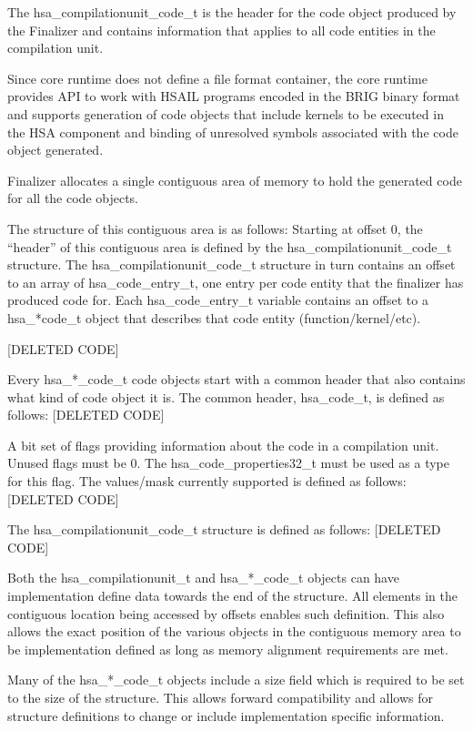 \documentclass[draft]{book}
\newcommand{\reftyp}[1]{#1}
\begin{document}
The \reftyp{hsa_compilationunit_code_t} is the header for the code object
produced by the Finalizer and contains information that applies to all code
entities in the compilation unit.

Since core runtime does not define a file format container, the core runtime
provides API to work with HSAIL programs encoded in the BRIG binary format and
supports generation of code objects that include kernels to be executed in the
HSA component and binding of unresolved symbols associated with the code object
generated.

Finalizer allocates a single contiguous area of memory to hold the generated
code for all the code objects.

The structure of this contiguous area is as follows: Starting at offset 0, the
``header'' of this contiguous area is defined by the
\reftyp{hsa_compilationunit_code_t} structure. The
\reftyp{hsa_compilationunit_code_t} structure in turn contains an offset to
an array of \reftyp{hsa_code_entry_t}, one entry per code entity that the
finalizer has produced code for. Each \reftyp{hsa_code_entry_t} variable
contains an offset to a \reftyp{hsa_*code_t} object that describes that code
entity (function/kernel/etc).

[DELETED CODE]

Every \reftyp{hsa_*_code_t} code objects start with a common header that also
contains what kind of code object it is. The common header,
\reftyp{hsa_code_t}, is defined as follows:
[DELETED CODE]

A bit set of flags providing information about the code in a compilation
unit. Unused flags must be 0. The \reftyp{hsa_code_properties32_t} must be
used as a type for this flag. The values/mask currently supported is defined as
follows:
[DELETED CODE]

The \reftyp{hsa_compilationunit_code_t} structure is defined as
follows:
[DELETED CODE]

Both the \reftyp{hsa_compilationunit_t} and \reftyp{hsa_*_code_t} objects
can have implementation define data towards the end of the structure. All
elements in the contiguous location being accessed by offsets enables such
definition. This also allows the exact position of the various objects in the
contiguous memory area to be implementation defined as long as memory alignment
requirements are met.

Many of the \reftyp{hsa_*_code_t} objects include a size field which is
required to be set to the size of the structure. This allows forward
compatibility and allows for structure definitions to change or include
implementation specific information.
\end{document}
